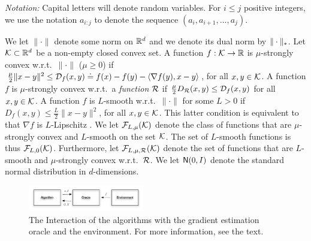 
\textit{Notation:} Capital letters will denote random variables.
For $i\le j$ positive integers,
 we use the notation $a_{i:j}$ to denote
 the sequence $(a_i,a_{i+1}, \dots, a_{j})$.

 We let $\| \cdot \|$ denote some norm on $\mathbb{R}^d$ and we denote its dual norm by $\|\cdot\|_*$. Let $\mathcal{K} \subset \mathbb{R}^d$ be a non-empty closed convex  set. A function $f:\mathcal{K} \to \mathbb{R}$ is $\mu$-strongly convex w.r.t.\  $\| \cdot \|$  ($\mu\ge 0$) if
 $\tfrac{\mu}{2} \|x-y\|^2 \le \mathcal{D}_f(x,y)\doteq f(x)-f(y)-\langle \nabla f(y),x-y \rangle$, for all $x,y \in \mathcal{K}$.
A function $f$ is $\mu$-strongly convex w.r.t.\  a \emph{function} $\mathcal{R}$
	if $\tfrac{\mu}{2}D_{\mathcal{R}}(x,y)\le\mathcal{D}_f(x,y)$ for all $x,y \in \mathcal{K}$.
 A function $f$ is $L$-smooth w.r.t.\  $\| \cdot \|$ for some $L>0$ if
$D_f(x,y) \le \tfrac{L}{2} \|x-y\|^2$, for all $x,y \in \mathcal{K}$.
 This latter condition is equivalent to that $\nabla f$ is $L$-Lipschitz \citep[Theorem~2.1.5]{nesterov2004introductory}.
 We let $\mathcal{F}_{L,\mu}(\mathcal{K})$ denote the class of functions that are $\mu$-strongly convex and $L$-smooth on the set $\mathcal{K}$.
 The set of $L$-smooth functions is thus $\mathcal{F}_{L,0}(\mathcal{K})$. Furthermore, let $\mathcal{F}_{L,\mu,\mathcal{R}}(\mathcal{K})$ denote the set of functions that are  $L$-smooth and $\mu$-strongly convex w.r.t.\  $\mathcal{R}$.
 We let $\mathsf{N}(0, I)$ denote the standard normal distribution in $d$-dimensions.

\begin{figure}
\begin{center}
\includegraphics[width=0.45\textwidth]{../figs/oracle}
\end{center}
\caption{The Interaction of the algorithms with the gradient estimation oracle and the environment. For more information, see the text.}
\label{fig:oracle}
\end{figure}

